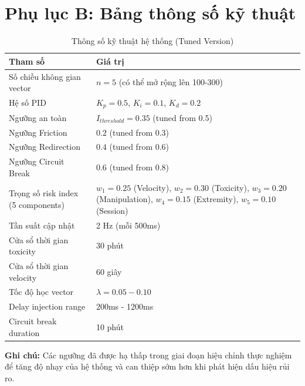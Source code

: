 \section{Phụ lục B: Bảng thông số kỹ thuật}

\begin{table}[H]
\centering
\caption{Thông số kỹ thuật hệ thống (Tuned Version)}
\begin{tabular}{|l|p{10cm}|}
\hline
\textbf{Tham số} & \textbf{Giá trị} \\
\hline
Số chiều không gian vector & $n = 5$ (có thể mở rộng lên 100-300) \\
\hline
Hệ số PID & $K_p = 0.5$, $K_i = 0.1$, $K_d = 0.2$ \\
\hline
Ngưỡng an toàn & $I_{threshold} = 0.35$ (tuned from 0.5) \\
\hline
Ngưỡng Friction & $0.2$ (tuned from 0.3) \\
\hline
Ngưỡng Redirection & $0.4$ (tuned from 0.6) \\
\hline
Ngưỡng Circuit Break & $0.6$ (tuned from 0.8) \\
\hline
Trọng số risk index (5 components) & $w_1 = 0.25$ (Velocity), $w_2 = 0.30$ (Toxicity), $w_3 = 0.20$ (Manipulation), $w_4 = 0.15$ (Extremity), $w_5 = 0.10$ (Session) \\
\hline
Tần suất cập nhật & 2 Hz (mỗi 500ms) \\
\hline
Cửa sổ thời gian toxicity & 30 phút \\
\hline
Cửa sổ thời gian velocity & 60 giây \\
\hline
Tốc độ học vector & $\lambda = 0.05 - 0.10$ \\
\hline
Delay injection range & 200ms - 1200ms \\
\hline
Circuit break duration & 10 phút \\
\hline
\end{tabular}
\end{table}

\textbf{Ghi chú:} Các ngưỡng đã được hạ thấp trong giai đoạn hiệu chỉnh thực nghiệm để tăng độ nhạy của hệ thống và can thiệp sớm hơn khi phát hiện dấu hiệu rủi ro.
